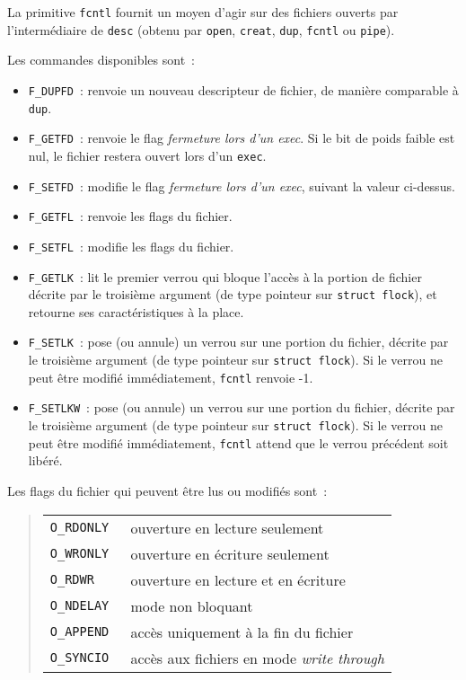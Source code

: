 \documentclass [twoside] {report}
\begin{document}
La primitive {\tt fcntl} fournit un moyen
d'agir sur des fichiers ouverts par
l'intermédiaire de
{\tt desc} (obtenu par {\tt open}, {\tt creat}, {\tt dup},
{\tt fcntl} ou {\tt pipe}).

Les commandes disponibles sont~:

\begin {itemize}
    \item {\tt F\_DUPFD}~: renvoie un nouveau descripteur de
	fichier, de manière comparable à {\tt dup}.

    \item {\tt F\_GETFD}~: renvoie le flag {\it fermeture lors
	d'un exec}. Si le bit de poids faible est nul, le
	fichier restera ouvert lors d'un {\tt exec}.

    \item {\tt F\_SETFD}~: modifie le flag {\it fermeture lors
	d'un exec}, suivant la valeur ci-dessus.

    \item {\tt F\_GETFL}~: renvoie les flags du fichier.

    \item {\tt F\_SETFL}~: modifie les flags du fichier.

    \item {\tt F\_GETLK}~:  lit le premier verrou qui bloque l'accès à
	la portion de fichier décrite par le troisième argument (de type
	pointeur sur {\tt struct flock}), et retourne ses
	caractéristiques à la place.

    \item {\tt F\_SETLK}~:  pose (ou annule) un verrou sur une portion
	du fichier, décrite par le troisième argument (de type pointeur
	sur {\tt struct flock}).  Si le verrou ne peut être modifié
	immédiatement, {\tt fcntl} renvoie -1.

    \item {\tt F\_SETLKW}~:  pose (ou annule) un verrou sur une portion
	du fichier, décrite par le troisième argument (de type pointeur
	sur {\tt struct flock}).  Si le verrou ne peut être modifié
	immédiatement, {\tt fcntl} attend que le verrou précédent soit
	libéré.

\end {itemize}


Les flags du fichier qui peuvent être lus ou modifiés sont~:

{\small
\begin {quote}
    \begin {tabular} {|ll|} \hline
	\tt O\_RDONLY & ouverture en lecture seulement \\
	\tt O\_WRONLY & ouverture en écriture seulement \\
	\tt O\_RDWR & ouverture en lecture et en écriture \\
	\tt O\_NDELAY & mode non bloquant \\
	\tt O\_APPEND & accès uniquement à la fin du fichier \\
	\tt O\_SYNCIO & accès aux fichiers en mode {\em write through}
	    \\ \hline
    \end {tabular}
\end {quote}
}
\end{document}
